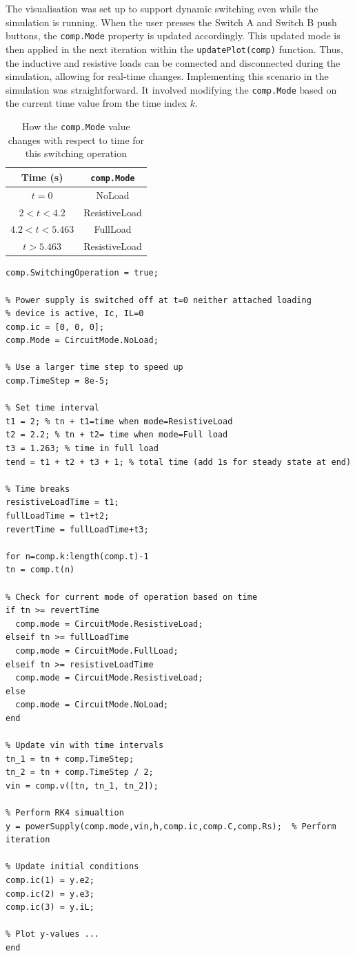 The visualisation was set up to support dynamic switching even while the simulation is running. When the user presses the Switch A and Switch B push buttons, the \texttt{comp.Mode} property is updated accordingly. This updated mode is then applied in the next iteration within the \texttt{updatePlot(comp)} function. Thus, the inductive and resistive loads can be connected and disconnected during the simulation, allowing for real-time changes. Implementing this scenario in the simulation was straightforward. It involved modifying the \texttt{comp.Mode} based on the current time value from the time index $k$.
\begin{table}[H]
    \centering
    \begin{tabular}{|c|c|}\hline
        Time (s) & \texttt{comp.Mode} \\\hline
        $t=0$ & NoLoad \\
        $2 < t < 4.2$ & ResistiveLoad \\
        $4.2 < t < 5.463$ & FullLoad \\
        $t > 5.463$ & ResistiveLoad \\\hline
    \end{tabular}
    \caption{How the \texttt{comp.Mode} value changes with respect to time for this switching operation}
    \label{tab:my_label}
\end{table}
\begin{lstlisting}[caption=Extract of code used to perform switching operation]
% Setup switching scenario
comp.SwitchingOperation = true;
            
% Power supply is switched off at t=0 neither attached loading
% device is active, Ic, IL=0
comp.ic = [0, 0, 0];
comp.Mode = CircuitMode.NoLoad;

% Use a larger time step to speed up
comp.TimeStep = 8e-5;

% Set time interval
t1 = 2; % tn + t1=time when mode=ResistiveLoad
t2 = 2.2; % tn + t2= time when mode=Full load
t3 = 1.263; % time in full load
tend = t1 + t2 + t3 + 1; % total time (add 1s for steady state at end)

% Time breaks
resistiveLoadTime = t1;
fullLoadTime = t1+t2;
revertTime = fullLoadTime+t3;

for n=comp.k:length(comp.t)-1
tn = comp.t(n)

% Check for current mode of operation based on time
if tn >= revertTime
  comp.mode = CircuitMode.ResistiveLoad;
elseif tn >= fullLoadTime
  comp.mode = CircuitMode.FullLoad;
elseif tn >= resistiveLoadTime
  comp.mode = CircuitMode.ResistiveLoad;
else
  comp.mode = CircuitMode.NoLoad;
end
	
% Update vin with time intervals
tn_1 = tn + comp.TimeStep;
tn_2 = tn + comp.TimeStep / 2;
vin = comp.v([tn, tn_1, tn_2]); 

% Perform RK4 simualtion
y = powerSupply(comp.mode,vin,h,comp.ic,comp.C,comp.Rs);  % Perform iteration
   
% Update initial conditions
comp.ic(1) = y.e2;
comp.ic(2) = y.e3;
comp.ic(3) = y.iL;
                
% Plot y-values ... 
end
\end{lstlisting}
